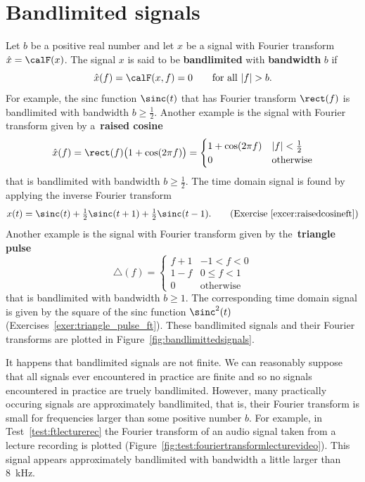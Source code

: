 \documentclass[11pt,a4paper]{book}
\theoremstyle{plain}
\numberwithin{equation}{section}
\newcommand{\term}{\textbf}
\newcommand{\abs}[1]{\left\vert #1 \right\vert}
\newcounter{test}
\begin{document}
\section{Bandlimited signals}\label{sec:bandlimited-signals}

Let $b$ be a positive real number and let $x$ be a signal with Fourier transform $\hat{x} = \calF(x)$.  The signal $x$ is said to be \term{bandlimited} with \term{bandwidth} $b$ if 
\[
\hat{x}(f) = \calF(x,f) = 0 \qquad \text{for all $\abs{f} > b$}.
\]  
For example, the sinc function $\sinc(t)$ that has Fourier transform $\rect(f)$ is bandlimited with bandwidth $b \geq \tfrac{1}{2}$.  Another example is the signal with Fourier transform given by a~\term{raised cosine}
\[
\hat{x}(f) = \rect(f) \big(1 + \cos( 2 \pi f )\big) = \begin{cases}
1 + \cos( 2\pi f ) & \abs{f} < \tfrac{1}{2} \\
0 & \text{otherwise}
\end{cases}
\]
that is bandlimited with bandwidth $b \geq \tfrac{1}{2}$.  The time domain signal is found by applying the inverse Fourier transform 
\[
x(t) = \sinc(t)+\tfrac{1}{2}\sinc(t+1)+\tfrac{1}{2}\sinc(t-1). \qquad \text{(Exercise~\ref{excer:raisedcosineft})}%
\]
Another example is the signal with Fourier transform given by the~\term{triangle pulse}
\[
\bigtriangleup(f) = \begin{cases}
f + 1 & -1 < f < 0 \\
1 - f & 0 \leq f < 1 \\
0 & \text{otherwise}
\end{cases}
\]
that is bandlimited with bandwidth $b \geq 1$.  The corresponding time domain signal is given by the square of the sinc function $\sinc^2(t)$ (Exercises~\ref{exer:triangle_pulse_ft}).  These bandlimited signals and their Fourier transforms are plotted in Figure~\ref{fig:bandlimittedsignals}.

It happens that bandlimited signals are not finite.  We can reasonably suppose that all signals ever encountered in practice are finite and so no signals encountered in practice are truely bandlimited.  However, many practically occuring signals are approximately bandlimited, that is, their Fourier transform is small for frequencies larger than some positive number $b$.  For example, in Test~\ref{test:ftlecturerec} the Fourier transform of an audio signal taken from a lecture recording is plotted  (Figure~\ref{fig:test:fouriertransformlecturevideo}).  This signal appears approximately bandlimited with bandwidth a little larger than \SI{8}{\kilo\hertz}.
\end{document}
